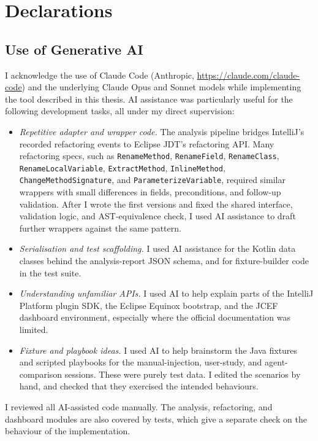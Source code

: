 \chapter{Declarations}
\label{ch:declarations}

\section{Use of Generative AI}
\label{sec:declarations-genai}

I acknowledge the use of Claude Code (Anthropic, \url{https://claude.com/claude-code}) and the underlying Claude Opus and Sonnet models while implementing the tool described in this thesis. AI assistance was particularly useful for the following development tasks, all under my direct supervision:

\begin{itemize}
  \item \emph{Repetitive adapter and wrapper code.} The analysis pipeline bridges IntelliJ's recorded refactoring events to Eclipse JDT's refactoring API. Many refactoring specs, such as \texttt{RenameMethod}, \texttt{RenameField}, \texttt{RenameClass}, \texttt{RenameLocalVariable}, \texttt{ExtractMethod}, \texttt{InlineMethod}, \texttt{ChangeMethodSignature}, and \texttt{ParameterizeVariable}, required similar wrappers with small differences in fields, preconditions, and follow-up validation. After I wrote the first versions and fixed the shared interface, validation logic, and AST-equivalence check, I used AI assistance to draft further wrappers against the same pattern.
  \item \emph{Serialisation and test scaffolding.} I used AI assistance for the Kotlin data classes behind the analysis-report JSON schema, and for fixture-builder code in the test suite.
  \item \emph{Understanding unfamiliar APIs.} I used AI to help explain parts of the IntelliJ Platform plugin SDK, the Eclipse Equinox bootstrap, and the JCEF dashboard environment, especially where the official documentation was limited.
  \item \emph{Fixture and playbook ideas.} I used AI to help brainstorm the Java fixtures and scripted playbooks for the manual-injection, user-study, and agent-comparison sessions. These were purely test data. I edited the scenarios by hand, and checked that they exercised the intended behaviours.
\end{itemize}

I reviewed all AI-assisted code manually. The analysis, refactoring, and dashboard modules are also covered by tests, which give a separate check on the behaviour of the implementation.

